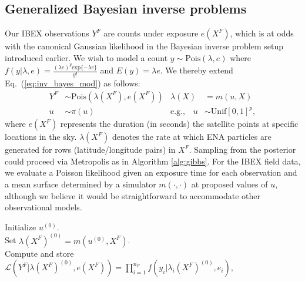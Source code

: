 \documentclass[11pt]{article}
\begin{document}
\subsection{Generalized Bayesian inverse problems}
\label{sec:gen_bayes_inv}

Our IBEX observations $Y^F$ are counts under exposure $e(X^F)$, which is at odds
with the canonical Gaussian likelihood in the Bayesian inverse problem setup
introduced earlier. We wish to model a count $y \sim \mathrm{Pois}(\lambda, e)$
where $f(y|\lambda, e) = \frac{(\lambda e)^y \mathrm{exp}\{-\lambda e\}}{y!}$
and $E(y) = \lambda e$. We thereby extend Eq.~(\ref{eq:inv_bayes_mod}) as
follows:
\begin{align}
Y^F &\sim \mathrm{Pois}(\lambda(X^F), e(X^F)) & \lambda(X) &= m(u, X) \nonumber
\label{eq:pois_inv_bayes_mod} \\ u &\sim \pi(u) & \mbox{e.g.,} \quad u &\sim \mathrm{Unif}[0,1]^p,
\end{align}
where $e(X^F)$ represents the duration (in seconds) the satellite points at
specific locations in the sky. $\lambda(X^F)$ denotes the rate at which ENA
particles are generated for rows (latitude/longitude pairs) in $X^F$. Sampling
from the posterior could proceed via Metropolis as in Algorithm \ref{alg:gibbs}.
For the IBEX field data, we evaluate a Poisson likelihood given an exposure
time for each observation and a mean surface determined by a simulator
$m(\cdot,\cdot)$ at proposed values of $u$, although we believe it would be
straightforward to accommodate other observational models.
\begin{algorithm}[ht]
\DontPrintSemicolon
Initialize $u^{(0)}$. \\
Set $\lambda(X^F)^{(0)} = m(u^{(0)}, X^F)$. \\
Compute and store $\mathcal{L}(Y^F|\lambda(X^F)^{(0)}, e(X^F)) =
\prod_{i=1}^{n_F} f(y_i|\lambda_i(X^F)^{(0)}, e_i)$, \\
\caption{MCMC (Metropolis-within-Gibbs) for Poisson Bayesian inverse problems}
\label{alg:gibbs}
\end{algorithm}
\end{document}

